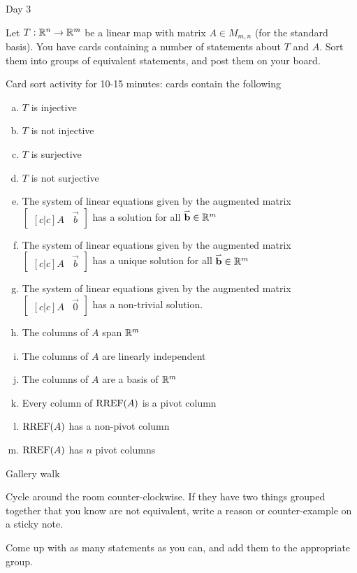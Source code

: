 
\begin{applicationActivities}{Day 3}

\begin{activity}{0}
Let $T: \mathbb{R}^n \rightarrow \mathbb{R}^m$ be a linear map with matrix $A \in M_{m,n}$ (for the standard basis).  You have cards containing a number of statements about $T$ and $A$.  Sort them into groups of equivalent statements, and post them on your board.

\begin{TBLnote}Card sort activity for 10-15 minutes: cards contain the following
\begin{enumerate}[(a)]
\item $T$ is injective
\item $T$ is not injective
\item $T$ is surjective
\item $T$ is not surjective
\item The system of linear equations given by the augmented matrix $\begin{bmatrix}[c|c]A & \vec{b} \end{bmatrix}$ has a solution for all $\mathbf{\accentset{\rightharpoonup}{b}} \in \mathbb{R}^m$
\item The system of linear equations given by the augmented matrix $\begin{bmatrix}[c|c]A & \vec{b} \end{bmatrix}$ has a unique solution for all $\mathbf{\accentset{\rightharpoonup}{b}} \in \mathbb{R}^m$
\item The system of linear equations given by the augmented matrix $\begin{bmatrix}[c|c] A & \vec{0} \end{bmatrix}$ has a non-trivial solution.
\item The columns of $A$ span $\mathbb{R}^m$
\item The columns of $A$ are linearly independent
\item The columns of $A$ are a basis of $\mathbb{R}^m$
\item Every column of $\operatorname{RREF}(A)$ is a pivot column
\item $\operatorname{RREF}(A)$ has a non-pivot column
\item $\operatorname{RREF}(A)$ has $n$ pivot columns
\end{enumerate}
\end{TBLnote}
\end{activity}

\begin{activity}{0}
\begin{TBLnote}Gallery walk \end{TBLnote}
Cycle around the room counter-clockwise.  If they have two things grouped together that you know are not equivalent, write a reason or counter-example on a sticky note.
\end{activity}

\begin{activity}{0}
Come up with as many statements as you can, and add them to the appropriate group.
\end{activity}

\end{applicationActivities}
